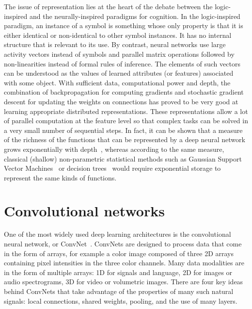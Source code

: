 \documentclass[10pts]{article}
\begin{document}
The issue of representation lies at the heart of the debate between the
logic-inspired and the neurally-inspired paradigms for cognition. In the
logic-inspired paradigm, an instance of a symbol is something whose only
property is that it is either identical or non-identical to other symbol
instances. It has no internal structure that is relevant to its use. By
contrast, neural networks use large activity vectors instead of symbols and
parallel matrix operations followed by non-linearities instead of formal
rules of inference. The elements of such vectors can be understood as
the values of learned attributes (or features) associated with some object. 
With sufficient data, computational power and depth,
the combination of backpropagation for computing gradients and stochastic
gradient descent for updating the weights on connections has proved to be
very good at learning appropriate distributed representations. These
representations allow a lot of parallel computation at the feature level so
that complex tasks can be solved in a very small number of sequential
steps. In fact, it can be shown that a measure of the richness of the functions
that can be represented by a deep neural network grows exponentially
with depth~\citep{Montufar-et-al-NIPS2014}, whereas according to the
same measure, classical (shallow) non-parametric statistical methods such as
Gaussian Support Vector Machines~\citep{Bengio-localfailure-NIPS-2006-small} 
or decision trees~\citep{Bengio-decision-trees10}
would require exponential storage 
to represent the same kinds of functions.

\section{Convolutional networks}




One of the most widely used deep learning architectures is the
convolutional neural network, or ConvNet~\cite{lecun-90c,lecun-98}. ConvNets
are designed to process data that come in the form of arrays, for
example a color image composed of three 2D arrays containing pixel
intensities in the three color channels. Many data modalities are in
the form of multiple arrays: 1D for signals and language, 2D for
images or audio spectrograms, 3D for video or volumetric images.
There are four key ideas behind ConvNets that take advantage of the
properties of many such natural signals: local connections, shared
weights, pooling, and the use of many layers.
\end{document}
